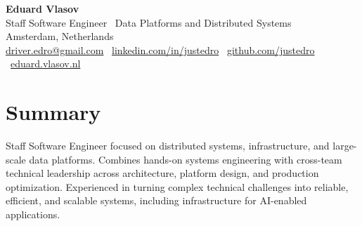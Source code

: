 \documentclass[a4paper,10pt]{article}
\makeatletter
\newcommand{\ehB}{ail}
\newcommand{\euC}{er.}
\newcommand{\ehD}{om}
\newcommand{\euA}{dr}
\newcommand{\euE}{ed}
\newcommand{\ehA}{gm}
\newcommand{\euD}{ro}
\newcommand{\ehC}{.c}
\newcommand{\euB}{iv}
\newcommand{\emailuser}{\euA\euB\euC\euE\euD}
\newcommand{\emailhost}{\ehA\ehB\ehC\ehD}
\newcommand{\resumeemail}{\emailuser @\emailhost}
\makeatother
\begin{document}
\begin{center}
  {\LARGE\textbf{Eduard Vlasov}}\\[0.25em]
  {\large Staff Software Engineer \textbar\ Data Platforms and Distributed Systems}\\[0.45em]
  \small Amsterdam, Netherlands\\[0.3em]
  \href{mailto:\resumeemail}{\resumeemail} \textbar\
  \href{https://www.linkedin.com/in/justedro}{linkedin.com/in/justedro} \textbar\
  \href{https://github.com/justedro}{github.com/justedro} \textbar\
  \href{https://eduard.vlasov.nl}{eduard.vlasov.nl}
\end{center}

\section{Summary}
Staff Software Engineer focused on distributed systems, infrastructure, and large-scale data platforms. Combines hands-on systems engineering with cross-team technical leadership across architecture, platform design, and production optimization. Experienced in turning complex technical challenges into reliable, efficient, and scalable systems, including infrastructure for AI-enabled applications.
\end{document}

